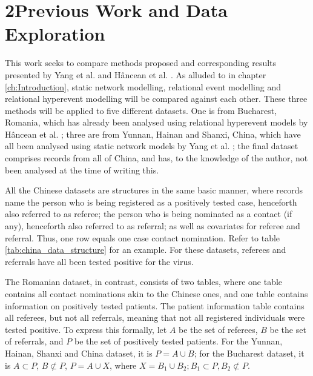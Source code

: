 \chapter{2\quad Previous Work and Data Exploration}
\label{ch:previous_work_data}

This work seeks to compare methods proposed and corresponding results presented by Yang et al. \cite{shaanxi_publication,hainan_publication} and Hâncean et al. \cite{hancean2022occupations}. As alluded to in chapter \ref{ch:Introduction}, static network modelling, relational event modelling and relational hyperevent modelling will be compared against each other. These three methods will be applied to five different datasets. One is from Bucharest, Romania, which has already been analysed using relational hyperevent models by Hâncean et al. \cite{hancean2022occupations}; three are from Yunnan, Hainan and Shanxi, China, which have all been analysed using static network models by Yang et al. \cite{hainan_publication,shaanxi_publication}; the final dataset comprises records from all of China, and has, to the knowledge of the author, not been analysed at the time of writing this.

All the Chinese datasets are structures in the same basic manner, where records name the person who is being registered as a positively tested case, henceforth also referred to as referee; the person who is being nominated as a contact (if any), henceforth also referred to as referral; as well as covariates for referee and referral. Thus, one row equals one case contact nomination. Refer to table \ref{tab:china_data_structure} for an example. For these datasets, referees and referrals have all been tested positive for the virus.

The Romanian dataset, in contrast, consists of two tables, where one table contains all contact nominations akin to the Chinese ones, and one table contains information on positively tested patients. The patient information table contains all referees, but not all referrals, meaning that not all registered individuals were tested positive. 
To express this formally, let $A$ be the set of referees, $B$ be the set of referrals, and $P$ be the set of positively tested patients. For the Yunnan, Hainan, Shanxi and China dataset, it is $P = A \cup B$; for the Bucharest dataset, it is $A \subset P$, $B \not\subset P$, $P = A \cup X$, where $X = B_1 \cup B_2; B_1 \subset P, B_2 \not\subset P$.

